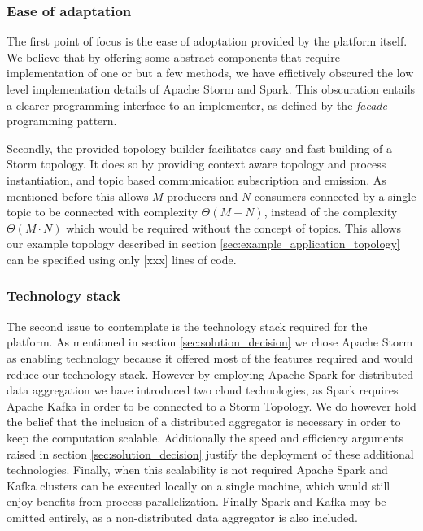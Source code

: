\subsubsection*{Ease of adaptation}
The first point of focus is the ease of adoptation provided by the platform itself. We believe that by offering some abstract components that require implementation of one or but a few methods, we have effictively obscured the low level implementation details of Apache Storm and Spark. This obscuration entails a clearer programming interface to an implementer, as defined by the \emph{facade} programming pattern. \cite{facade_pattern} 

Secondly, the provided topology builder facilitates easy and fast building of a Storm topology. It does so by providing context aware topology and process instantiation, and topic based communication subscription and emission.  As mentioned before this allows $M$ producers and $N$ consumers connected by a single topic to be connected with complexity $\Theta(M+N)$, instead of the complexity $\Theta(M\cdot N)$ which would be required without the concept of topics. This allows our example topology described in section \ref{sec:example_application_topology} can be specified using only [xxx] lines of code.

\subsubsection*{Technology stack}
The second issue to contemplate is the technology stack required for the platform. As mentioned in section \ref{sec:solution_decision} we chose Apache Storm as enabling technology because it offered most of the features required and would reduce our technology stack. However by employing Apache Spark for distributed data aggregation we have introduced two cloud technologies, as Spark requires Apache Kafka in order to be connected to a Storm Topology. We do however hold the belief that the inclusion of a distributed aggregator is necessary in order to keep the computation scalable. Additionally the speed and efficiency arguments raised in section \ref{sec:solution_decision} justify the deployment of these additional technologies. Finally, when this scalability is not required Apache Spark and Kafka clusters can be executed locally on a single machine, which would still enjoy benefits from process parallelization. Finally Spark and Kafka may be omitted entirely, as a non-distributed data aggregator is also included.

